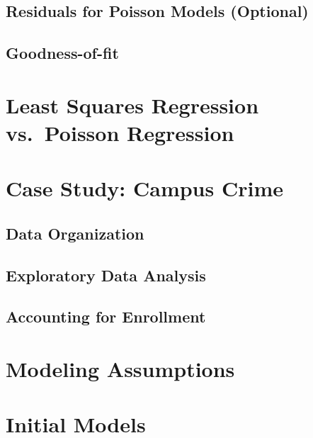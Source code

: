 \documentclass[
]{krantz}
\begin{document}
\hypertarget{sec-PoisResid}{%
\subsection{Residuals for Poisson Models (Optional)}\label{sec-PoisResid}}

\hypertarget{sec-PoisGOF}{%
\subsection{Goodness-of-fit}\label{sec-PoisGOF}}

\hypertarget{least-squares-regression-vs.-poisson-regression}{%
\section{Least Squares Regression vs.~Poisson Regression}\label{least-squares-regression-vs.-poisson-regression}}

\hypertarget{case-study-campus-crime}{%
\section{Case Study: Campus Crime}\label{case-study-campus-crime}}

\hypertarget{data-organization-1}{%
\subsection{Data Organization}\label{data-organization-1}}

\hypertarget{exploratory-data-analysis}{%
\subsection{Exploratory Data Analysis}\label{exploratory-data-analysis}}

\hypertarget{accounting-for-enrollment}{%
\subsection{Accounting for Enrollment}\label{accounting-for-enrollment}}

\hypertarget{modeling-assumptions}{%
\section{Modeling Assumptions}\label{modeling-assumptions}}

\hypertarget{initial-models}{%
\section{Initial Models}\label{initial-models}}
\end{document}
